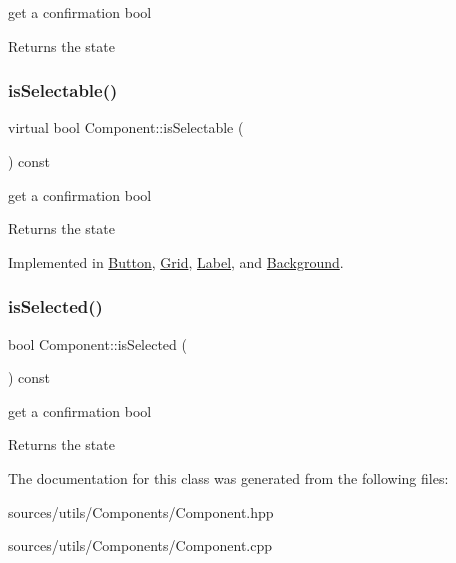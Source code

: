 get a confirmation bool 

\begin{DoxyReturn}{Returns}
the state 
\end{DoxyReturn}
\mbox{\label{classComponent_aede74a18a443413465216f383a046028}} 
\subsubsection{\texorpdfstring{is\+Selectable()}{isSelectable()}}
{\footnotesize\ttfamily virtual bool Component\+::is\+Selectable (\begin{DoxyParamCaption}{ }\end{DoxyParamCaption}) const\hspace{0.3cm}{\ttfamily [pure virtual]}}



get a confirmation bool 

\begin{DoxyReturn}{Returns}
the state 
\end{DoxyReturn}


Implemented in \hyperlink{classButton_a6f51f01b72f9c3319e96263dc59a677f}{Button}, \hyperlink{classGrid_a4ef4763b55dc2696af8a71fdeabe999a}{Grid}, \hyperlink{classLabel_ac27e6e31942be4612d282af282b65051}{Label}, and \hyperlink{classBackground_acc764dce6ac4f8843bc9950dad313ee4}{Background}.

\mbox{\label{classComponent_a4c480061afaabc44339ca63916711294}} 
\subsubsection{\texorpdfstring{is\+Selected()}{isSelected()}}
{\footnotesize\ttfamily bool Component\+::is\+Selected (\begin{DoxyParamCaption}{ }\end{DoxyParamCaption}) const}



get a confirmation bool 

\begin{DoxyReturn}{Returns}
the state 
\end{DoxyReturn}


The documentation for this class was generated from the following files\+:\begin{DoxyCompactItemize}
\item 
sources/utils/\+Components/Component.\+hpp\item 
sources/utils/\+Components/Component.\+cpp\end{DoxyCompactItemize}
